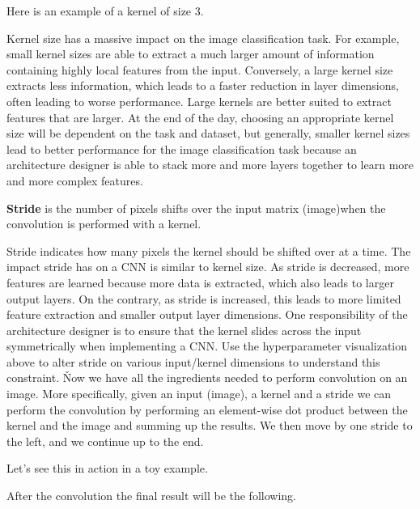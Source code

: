 \be
Here is an example of a kernel of size 3.

\vspace{-10pt}


\vspace{-10pt}
\ee

Kernel size has a massive impact on the image classification task. For example, small kernel sizes are able to 
extract a much larger amount of information containing highly local features from the input. Conversely, a large 
kernel size extracts less information, which leads to a faster reduction in layer dimensions, often leading to worse
performance. Large kernels are better suited to extract features that are larger. At the end of the day, choosing an
appropriate kernel size will be dependent on the task and dataset, but generally, smaller kernel sizes lead to 
better performance for the image classification task because an architecture designer is able to stack more and more 
layers together to learn more and more complex features.

\bd[Stride]
\textbf{Stride} is the number of pixels shifts over the input matrix (image)when the convolution is performed with a
kernel.
\ed

Stride indicates how many pixels the kernel should be shifted over at a time. The impact stride has on a CNN is 
similar to kernel size. As stride is decreased, more features are learned because more data is extracted, which also
leads to larger output layers. On the contrary, as stride is increased, this leads to more limited feature 
extraction and smaller output layer dimensions. One responsibility of the architecture designer is to ensure that the
kernel slides across the input symmetrically when implementing a CNN. Use the hyperparameter visualization above to 
alter stride on various input/kernel dimensions to understand this constraint. \v

Now we have all the ingredients needed to perform convolution on an image. More specifically, given an input (image),
a kernel and a stride we can perform the convolution by performing an element-wise dot product between the kernel
and the image and summing up the results. We then move by one stride to the left, and we continue up to the end.

\be
Let's see this in action in a toy example.


After the convolution the final result will be the following.

